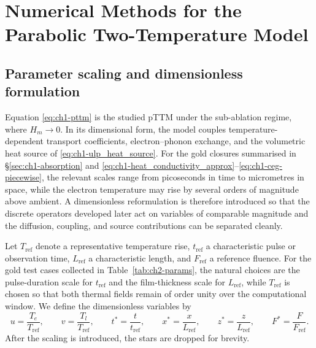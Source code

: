 \chapter{Numerical Methods for the Parabolic Two-Temperature Model}
\label{ch:numerical-methods}

\section{Parameter scaling and dimensionless formulation}
\label{sec:ch2-scaling}

Equation \eqref{eq:ch1-pttm} is the studied pTTM under the sub-ablation regime, where $H_m \rightarrow 0$.
In its dimensional form, the model couples temperature-dependent transport coefficients, electron--phonon exchange, and the volumetric heat source of \eqref{eq:ch1-ulp_heat_source}. For the gold closures summarised in \S\ref{sec:ch1-absorption} and \eqref{eq:ch1-heat_conductivity_approx}--\eqref{eq:ch1-ceg-piecewise}, the relevant scales range from picoseconds in time to micrometres in space, while the electron temperature may rise by several orders of magnitude above ambient. A dimensionless reformulation is therefore introduced so that the discrete operators developed later act on variables of comparable magnitude and the diffusion, coupling, and source contributions can be separated cleanly.

Let $T_{\mathrm{ref}}$ denote a representative temperature rise, $t_{\mathrm{ref}}$ a characteristic pulse or observation time, $L_{\mathrm{ref}}$ a characteristic length, and $F_{\mathrm{ref}}$ a reference fluence. For the gold test cases collected in Table~\ref{tab:ch2-params}, the natural choices are the pulse-duration scale for $t_{\mathrm{ref}}$ and the film-thickness scale for $L_{\mathrm{ref}}$, while $T_{\mathrm{ref}}$ is chosen so that both thermal fields remain of order unity over the computational window. We define the dimensionless variables by
\begin{equation}
    u = \frac{T_e}{T_{\mathrm{ref}}}, \qquad
    v = \frac{T_l}{T_{\mathrm{ref}}}, \qquad
    t^* = \frac{t}{t_{\mathrm{ref}}}, \qquad
    x^* = \frac{x}{L_{\mathrm{ref}}}, \qquad
    z^* = \frac{z}{L_{\mathrm{ref}}}, \qquad
    F^* = \frac{F}{F_{\mathrm{ref}}}.
\end{equation}
After the scaling is introduced, the stars are dropped for brevity.

